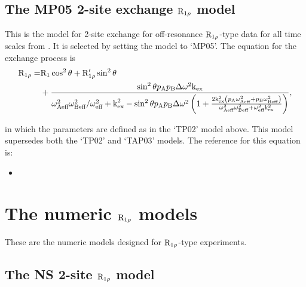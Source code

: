 \subsection{The MP05 2-site exchange $\mathrm{R}_{1\rho}$ model}
\label{sect: dispersion: MP05 model}

This is the model for 2-site exchange for off-resonance $\mathrm{R}_{1\rho}$-type data for all time scales from \citet{MiloushevPalmer05}.
It is selected by setting the model to `MP05'.
The equation for the exchange process is
\begin{align}
    \mathrm{R}_{1\rho} = & \mathrm{R}_1\cos^2\theta + \mathrm{R}_{1\rho}'\sin^2\theta \nonumber \\
               & + \frac{\sin^2\theta p_\textrm{A}p_\textrm{B}\Delta\omega^2\textrm{k}_\textrm{ex}}{\omega_\textrm{Aeff}^2\omega_\textrm{Beff}^2/\omega_\textrm{eff}^2 + \textrm{k}_\textrm{ex}^2 - \sin^2\theta p_\textrm{A}p_\textrm{B}\Delta\omega^2 \left(
                        1 + \frac{2\textrm{k}_\textrm{ex}^2 \left( p_\textrm{A}\omega_\textrm{Aeff}^2 + p_\textrm{B}\omega_\textrm{Beff}^2 \right)}{\omega_\textrm{Aeff}^2\omega_\textrm{Beff}^2 + \omega_\textrm{eff}^2\textrm{k}_\textrm{ex}^2}
                    \right)},
\end{align}

in which the parameters are defined as in the `TP02' model above.
This model supersedes both the `TP02' and `TAP03' models.
The reference for this equation is:
\begin{itemize}
\item {}
\end{itemize}




\section{The numeric $\mathrm{R}_{1\rho}$ models}
\label{sect: dispersion: numeric R1rho models}

These are the numeric models designed for $\mathrm{R}_{1\rho}$-type experiments.



\subsection{The NS 2-site $\mathrm{R}_{1\rho}$ model}
\label{sect: dispersion: NS R1rho 2-site model}

